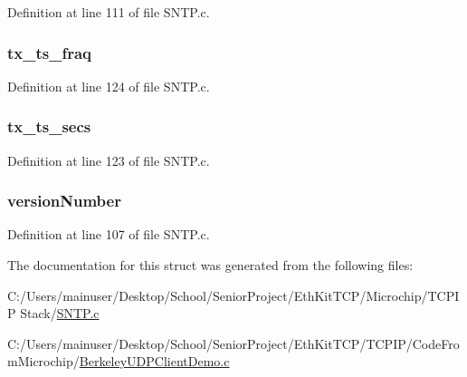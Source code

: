 Definition at line 111 of file S\+N\+T\+P.\+c.

\hypertarget{struct_n_t_p___p_a_c_k_e_t_aaeae6816df84561e9a3e03c73924a4f8}{}
\subsubsection[{tx\+\_\+ts\+\_\+fraq}]{ tx\+\_\+ts\+\_\+fraq}\label{struct_n_t_p___p_a_c_k_e_t_aaeae6816df84561e9a3e03c73924a4f8}


Definition at line 124 of file S\+N\+T\+P.\+c.

\hypertarget{struct_n_t_p___p_a_c_k_e_t_ab96cffa936cacee59ceee3685ba44237}{}
\subsubsection[{tx\+\_\+ts\+\_\+secs}]{ tx\+\_\+ts\+\_\+secs}\label{struct_n_t_p___p_a_c_k_e_t_ab96cffa936cacee59ceee3685ba44237}


Definition at line 123 of file S\+N\+T\+P.\+c.

\hypertarget{struct_n_t_p___p_a_c_k_e_t_a7487f860e8661c343c34fef877651c8f}{}
\subsubsection[{version\+Number}]{ version\+Number}\label{struct_n_t_p___p_a_c_k_e_t_a7487f860e8661c343c34fef877651c8f}


Definition at line 107 of file S\+N\+T\+P.\+c.



The documentation for this struct was generated from the following files\+:\begin{DoxyCompactItemize}
\item 
C\+:/\+Users/mainuser/\+Desktop/\+School/\+Senior\+Project/\+Eth\+Kit\+T\+C\+P/\+Microchip/\+T\+C\+P\+I\+P Stack/\hyperlink{_s_n_t_p_8c}{S\+N\+T\+P.\+c}\item 
C\+:/\+Users/mainuser/\+Desktop/\+School/\+Senior\+Project/\+Eth\+Kit\+T\+C\+P/\+T\+C\+P\+I\+P/\+Code\+From\+Microchip/\hyperlink{_berkeley_u_d_p_client_demo_8c}{Berkeley\+U\+D\+P\+Client\+Demo.\+c}\end{DoxyCompactItemize}
